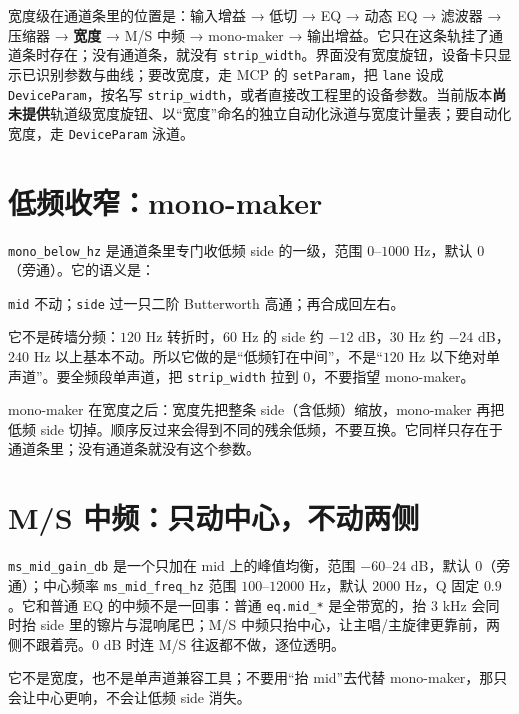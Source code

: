 宽度级在通道条里的位置是：输入增益 → 低切 → EQ → 动态 EQ → 滤波器 → 压缩器 → \textbf{宽度} → M/S 中频 → mono-maker → 输出增益。它只在这条轨挂了通道条时存在；没有通道条，就没有 \texttt{strip\_width}。界面没有宽度旋钮，设备卡只显示已识别参数与曲线；要改宽度，走 MCP 的 \texttt{setParam}，把 \texttt{lane} 设成 \texttt{DeviceParam}，按名写 \texttt{strip\_width}，或者直接改工程里的设备参数。当前版本\textbf{尚未提供}轨道级宽度旋钮、以“宽度”命名的独立自动化泳道与宽度计量表；要自动化宽度，走 \texttt{DeviceParam} 泳道。


\section{低频收窄：mono-maker}

\texttt{mono\_below\_hz} 是通道条里专门收低频 side 的一级，范围 $0$–$1000$ Hz，默认 $0$（旁通）。它的语义是：

\begin{center}
\texttt{mid} 不动；\quad \texttt{side} 过一只二阶 Butterworth 高通；\quad 再合成回左右。
\end{center}

它不是砖墙分频：$120$ Hz 转折时，$60$ Hz 的 side 约 $-12$ dB，$30$ Hz 约 $-24$ dB，$240$ Hz 以上基本不动。所以它做的是“低频钉在中间”，不是“$120$ Hz 以下绝对单声道”。要全频段单声道，把 \texttt{strip\_width} 拉到 $0$，不要指望 mono-maker。

mono-maker 在宽度之后：宽度先把整条 side（含低频）缩放，mono-maker 再把低频 side 切掉。顺序反过来会得到不同的残余低频，不要互换。它同样只存在于通道条里；没有通道条就没有这个参数。

\section{M/S 中频：只动中心，不动两侧}

\texttt{ms\_mid\_gain\_db} 是一个只加在 mid 上的峰值均衡，范围 $-60$–$24$ dB，默认 $0$（旁通）；中心频率 \texttt{ms\_mid\_freq\_hz} 范围 $100$–$12000$ Hz，默认 $2000$ Hz，Q 固定 $0.9$。它和普通 EQ 的中频不是一回事：普通 \texttt{eq.mid\_*} 是全带宽的，抬 3 kHz 会同时抬 side 里的镲片与混响尾巴；M/S 中频只抬中心，让主唱/主旋律更靠前，两侧不跟着亮。$0$ dB 时连 M/S 往返都不做，逐位透明。

它不是宽度，也不是单声道兼容工具；不要用“抬 mid”去代替 mono-maker，那只会让中心更响，不会让低频 side 消失。

